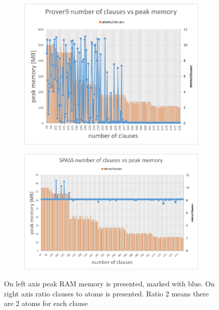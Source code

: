 \begin{figure}[ht]
\centering
  \begin{subfigure}{0.85\textwidth}
\centering
  \includegraphics[width=\textwidth]{logic-formula-generator/dataset_analysis/cnf charts/02 Prover9 number of clauses vs peak memory.jpg}
  \label{pic:benchmark_results}
  \end{subfigure}

  \begin{subfigure}{\textwidth}
\centering
\includegraphics[width=\textwidth]{logic-formula-generator/dataset_analysis/cnf charts/12 SPASS number of clauses vs peak memory.jpg}
  \end{subfigure}
  \caption{On left axis peak RAM memory is presented, marked with blue. On right axis ratio clauses to atoms is presented. Ratio 2 means there are 2 atoms for each clause}
  \label{pic:SPASSProverMemory}
\end{figure}

